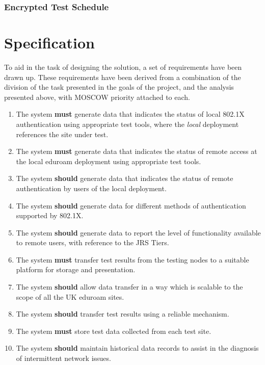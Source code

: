 \subsubsection{Encrypted Test Schedule}


\clearpage
\section{Specification}

To aid in the task of designing the solution, a set of requirements have
been drawn up. These requirements have been derived from a combination of the
division of the task presented in the goals of the project, and the analysis
presented above, with MOSCOW priority attached to each.

\begin{enumerate}
    \setlength{\itemsep}{1pt}
    \item The system \textbf{must} generate data that indicates the status of local
802.1X authentication using appropriate test tools, where the \emph{local}
deployment references the site under test.
    \item The system \textbf{must} generate data that indicates the status of remote
access at the local eduroam deployment using appropriate test tools.
    \item The system \textbf{should} generate data that indicates the status of remote
authentication by users of the local deployment.
    \item The system \textbf{should} generate data for different methods of
authentication supported by 802.1X.
    \item The system \textbf{should} generate data to report the level of functionality
available to remote users, with reference to the JRS Tiers\cite{janet-tech}.
    \item The system \textbf{must} transfer test results from the testing nodes to a
suitable platform for storage and presentation.
    \item The system \textbf{should} allow data transfer in a way which is scalable to
the scope of all the UK eduroam sites.
    \item The system \textbf{should} transfer test results using a reliable mechanism.
    \item The system \textbf{must} store test data collected from each test site.
    \item The system \textbf{should} maintain historical data records to assist in the
diagnosis of intermittent network issues.

\end{enumerate}
